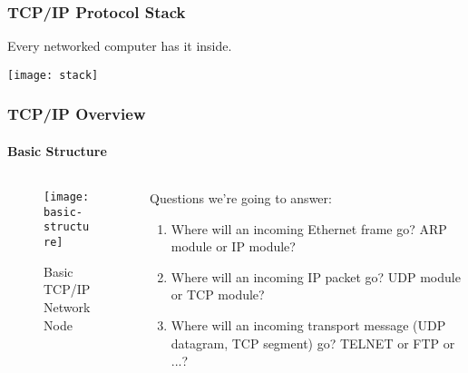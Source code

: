 \documentclass[hyperref={xetex,colorlinks,linkcolor=blue},green,compress]{beamer}
\begin{document}
\begin{frame}\frametitle{TCP/IP Protocol Stack}
  Every networked computer has it inside.

\begin{center}
  \texttt{[image: stack]}
\end{center}
\end{frame}

  \begin{frame}
    \frametitle{TCP/IP Overview} \framesubtitle{Basic Structure}
    \begin{columns}[t]
      \begin{column}{.5\textwidth}
        \begin{figure}
          \centering
          \texttt{[image: basic-structure]}
          \caption{Basic TCP/IP Network Node}
          \label{fig:basic-node}
        \end{figure}
      \end{column}

      \begin{column}{.5\textwidth}
        
        \begin{exampleblock}{Questions we're going to answer:}
        \begin{enumerate}
        \item Where will an incoming Ethernet frame go? ARP module or IP module?
        \item Where will an incoming IP packet go? UDP module or TCP module? %
        \item Where will an incoming transport message (UDP datagram, TCP segment) go? TELNET or FTP or ...?
        \end{enumerate}
        \end{exampleblock}
      \end{column}
    \end{columns}
  \end{frame}
\end{document}
